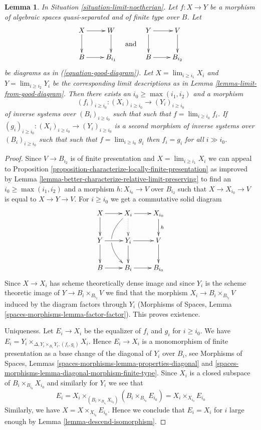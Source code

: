 \documentclass{stacks-project}
\theoremstyle{plain}
\newtheorem{lemma}[subsection]{Lemma}
\theoremstyle{definition}
\theoremstyle{remark}
\numberwithin{equation}{subsection}
\def\lim{\mathop{\mathrm{lim}}\nolimits}
\begin{document}
\begin{lemma}
\label{lemma-morphism-good-diagram}
In Situation \ref{situation-limit-noetherian}.
Let $f : X \to Y$ be a morphism of algebraic spaces quasi-separated
and of finite type over $B$. Let
$$
\vcenter{
\xymatrix{
X \ar[r] \ar[d] & W \ar[d] \\
B \ar[r] & B_{i_1}
}
}
\quad\text{and}\quad
\vcenter{
\xymatrix{
Y \ar[r] \ar[d] & V \ar[d] \\
B \ar[r] & B_{i_2}
}
}
$$
be diagrams as in (\ref{equation-good-diagram}). Let
$X = \lim_{i \geq i_1} X_i$ and
$Y = \lim_{i \geq i_2} Y_i$ be the corresponding
limit descriptions as in Lemma \ref{lemma-limit-from-good-diagram}.
Then there exists an $i_0 \geq \max(i_1, i_2)$ and a morphism
$$
(f_i)_{i \geq i_0} : (X_i)_{i \geq i_0} \to (Y_i)_{i \geq i_0}
$$
of inverse systems over $(B_i)_{i \geq i_0}$ such that
such that $f = \lim_{i \geq i_0} f_i$.
If $(g_i)_{i \geq i_0} : (X_i)_{i \geq i_0} \to (Y_i)_{i \geq i_0}$
is a second morphism of inverse systems over $(B_i)_{i \geq i_0}$ such that
such that $f = \lim_{i \geq i_0} g_i$
then $f_i = g_i$ for all $i \gg i_0$.
\end{lemma}

\begin{proof}
Since $V \to B_{i_2}$ is of finite presentation and
$X = \lim_{i \geq i_1} X_i$ we can appeal to Proposition
\ref{proposition-characterize-locally-finite-presentation}
as improved by Lemma \ref{lemma-better-characterize-relative-limit-preserving}
to find an $i_0 \geq \max(i_1, i_2)$ and a morphism $h : X_{i_0} \to V$
over $B_{i_2}$ such that $X \to X_{i_0} \to V$ is equal to $X \to Y \to V$.
For $i \geq i_0$ we get a commutative solid diagram
$$
\xymatrix{
X \ar[d] \ar[r] &
X_i \ar[r] \ar@{..>}[d] \ar@/_2pc/[dd] |!{[d];[ld]}\hole &
X_{i_0} \ar[d]^h \\
Y \ar[r] \ar[d] & Y_i \ar[r] \ar[d] & V \ar[d] \\
B \ar[r] & B_i \ar[r] & B_{i_0}
}
$$
Since $X \to X_i$ has scheme theoretically dense image
and since $Y_i$ is the scheme theoretic image of
$Y \to B_i \times_{B_{i_2}} V$
we find that the morphism $X_i \to B_i \times_{B_{i_2}} V$
induced by the diagram factors through $Y_i$
(Morphisms of Spaces, Lemma \ref{spaces-morphisms-lemma-factor-factor}).
This proves existence.

\medskip\noindent
Uniqueness. Let $E_i \to X_i$ be the equalizer of $f_i$ and $g_i$
for $i \geq i_0$. We have
$E_i = Y_i \times_{\Delta, Y_i \times_{B_i} Y_i, (f_i, g_i)} X_i$.
Hence $E_i \to X_i$ is a monomorphism of finite presentation as a base
change of the diagonal of $Y_i$ over $B_i$, see
Morphisms of Spaces, Lemmas \ref{spaces-morphisms-lemma-properties-diagonal} and
\ref{spaces-morphisms-lemma-diagonal-morphism-finite-type}.
Since $X_i$ is a closed subspace of $B_i \times_{B_{i_0}} X_{i_0}$
and similarly for $Y_i$ we see that
$$
E_i =
X_i \times_{(B_i \times_{B_{i_0}} X_{i_0})} (B_i \times_{B_{i_0}} E_{i_0}) =
X_i \times_{X_{i_0}} E_{i_0}
$$
Similarly, we have $X = X \times_{X_{i_0}} E_{i_0}$. Hence we conclude
that $E_i = X_i$ for $i$ large enough by Lemma \ref{lemma-descend-isomorphism}.
\end{proof}
\end{document}
